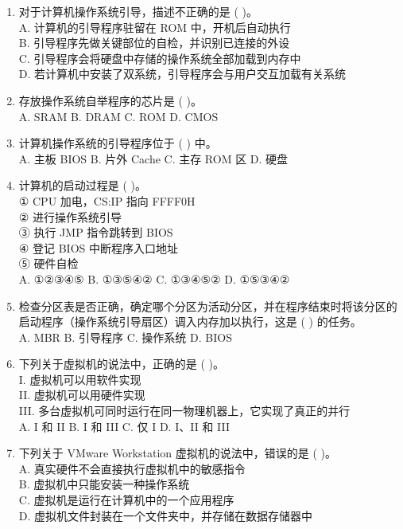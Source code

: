 \documentclass[lang=cn,newtx,10pt,scheme=chinese]{../../elegantbook}
\begin{document}
\begin{enumerate}
    \item 对于计算机操作系统引导，描述不正确的是 (    )。\\
    A. 计算机的引导程序驻留在 ROM 中，开机后自动执行\\
    B. 引导程序先做关键部位的自检，并识别已连接的外设\\
    C. 引导程序会将硬盘中存储的操作系统全部加载到内存中\\
    D. 若计算机中安装了双系统，引导程序会与用户交互加载有关系统

    \item 存放操作系统自举程序的芯片是 (    )。\\
    A. SRAM \quad B. DRAM \quad C. ROM \quad D. CMOS

    \item 计算机操作系统的引导程序位于 (    ) 中。\\
    A. 主板 BIOS \quad B. 片外 Cache \quad C. 主存 ROM 区 \quad D. 硬盘

    \item 计算机的启动过程是 (    )。\\
    ① CPU 加电，CS:IP 指向 FFFF0H\\
    ② 进行操作系统引导\\
    ③ 执行 JMP 指令跳转到 BIOS\\
    ④ 登记 BIOS 中断程序入口地址\\
    ⑤ 硬件自检\\
    A. ①②③④⑤ \quad B. ①③⑤④② \quad C. ①③④⑤② \quad D. ①⑤③④②

    \item 检查分区表是否正确，确定哪个分区为活动分区，并在程序结束时将该分区的启动程序（操作系统引导扇区）调入内存加以执行，这是 (    ) 的任务。\\
    A. MBR \quad B. 引导程序 \quad C. 操作系统 \quad D. BIOS

    \item 下列关于虚拟机的说法中，正确的是 (    )。\\
    I. 虚拟机可以用软件实现\\
    II. 虚拟机可以用硬件实现\\
    III. 多台虚拟机可同时运行在同一物理机器上，它实现了真正的并行\\
    A. I 和 II \quad B. I 和 III \quad C. 仅 I \quad D. I、II 和 III

    \item 下列关于 VMware Workstation 虚拟机的说法中，错误的是 (    )。\\
    A. 真实硬件不会直接执行虚拟机中的敏感指令\\
    B. 虚拟机中只能安装一种操作系统\\
    C. 虚拟机是运行在计算机中的一个应用程序\\
    D. 虚拟机文件封装在一个文件夹中，并存储在数据存储器中


\end{enumerate}
\end{document}
